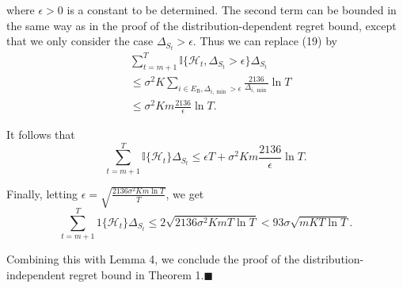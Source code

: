 \documentclass[opre,sglanonrev]{informs4}
\begin{document}
where $\epsilon>0$ is a constant to be determined. The second term can be bounded in the same way as in the proof of the distribution-dependent regret bound, except that we only consider the case $\Delta_{S_t}>\epsilon$. Thus we can replace (19) by
\begin{equation}
	\begin{aligned}
		&\sum_{t=m+1}^T\mathbb{I}\{\mathcal{H}_t,\Delta_{S_t}>\epsilon\}\Delta_{S_t}\\
		&\leq \sigma^2K\sum_{i\in E_\mathrm{B},\Delta_{i,\min}>\epsilon}\frac{2136}{\Delta_{i,\min}}\ln T\\
		&\leq \sigma^2Km\frac{2136}{\epsilon}\ln T.
	\end{aligned}
\end{equation}

It follows that
$$\sum_{t=m+1}^T\mathbb{I}\{\mathcal{H}_t\}\Delta_{S_t}\leq\epsilon T+\sigma^2Km\frac{2136}{\epsilon}\ln T.$$

Finally, letting $\epsilon=\sqrt{\frac{2136\sigma^2Km\ln T}{T}}$, we get 
$$\sum_{t=m+1}^T1\{\mathcal{H}_t\}\Delta_{S_t}\leq2\sqrt{2136\sigma^2KmT\ln T}<93\sigma\sqrt{mKT\ln T}.$$

Combining this with Lemma 4, we conclude the proof of the distribution-independent regret bound in Theorem 1.\hfill $\blacksquare$



\end{document}
